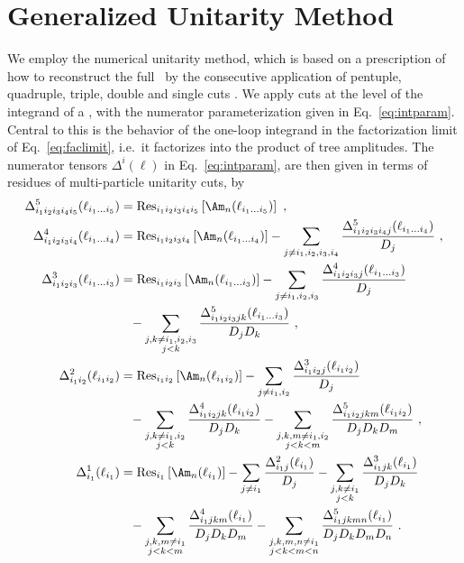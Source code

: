 \section{Generalized Unitarity Method}
We employ the numerical unitarity method, which is based on a prescription of how to reconstruct the full \ola~by the consecutive
application of pentuple, quadruple, triple, double and single cuts
\cite{Bern:1997sc,Britto:2004nc}. We apply cuts at the level of
the integrand of a \ola, with the numerator parameterization given in
Eq.~\eqref{eq:intparam}. Central to this is the behavior of the
one-loop integrand in the factorization limit of
Eq.~\eqref{eq:faclimit}, i.e.\ it factorizes into the product of tree
amplitudes. The numerator tensors $\Delta^i(\ell)$ in
Eq.~\eqref{eq:intparam}, are then given in terms of residues of
multi-particle unitarity cuts, by
\begin{align}\label{eq:unitarityrel}
\begin{split}
  \Delta_{i_1i_2i_3i_4i_5}^5(\ell_{i_1\dots i_5}) &=
  \text{Res}_{i_1i_2i_3i_4i_5}\left[\Am_n(\ell_{i_1\dots i_5})\right]\
  ,\\
  \Delta_{i_1i_2i_3i_4}^4(\ell_{i_1\dots i_4}) &=
  \text{Res}_{i_1i_2i_3i_4}\left[\Am_n(\ell_{i_1\dots i_4})\right]-\sum_{j\neq
      i_1,i_2,i_3,i_4}\frac{\Delta_{i_1i_2i_3i_4j}^5(\ell_{i_1\dots
        i_4})}{D_j}\ ,\\
 \Delta_{i_1i_2i_3}^3(\ell_{i_1\dots i_3}) &=
  \text{Res}_{i_1i_2i_3}\left[\Am_n(\ell_{i_1\dots i_3})\right]-\sum_{j\neq
        i_1,i_2,i_3}\frac{\Delta^4_{i_1i_2i_3j}(\ell_{i_1\dots
          i_3})}{D_j} \\
     &\phantom{=} -\sum_{\substack{j,k\neq
          i_1,i_2,i_3\\j<k}}\frac{\Delta^5_{i_1i_2i_3jk}(\ell_{i_1\dots
          i_3})}{D_jD_k}\ ,\\
 \Delta_{i_1i_2}^2(\ell_{i_1i_2}) &=
  \text{Res}_{i_1i_2}\left[\Am_n(\ell_{i_1i_2})\right]-\sum_{j\neq
        i_1,i_2}\frac{\Delta^3_{i_1i_2j}(\ell_{i_1i_2})}{D_j}\\
&\phantom{=}-\sum_{\substack{j,k\neq
        i_1,i_2\\j< k}}\frac{\Delta^4_{i_1i_2jk}(\ell_{i_1i_2})}{D_jD_k} -
    \sum_{\substack{j,k,m\neq
        i_1,i_2\\j<k<m}}\frac{\Delta^5_{i_1i_2jkm}(\ell_{i_1i_2})}{D_jD_kD_m}\
    ,\\
 \Delta_{i_1}^1(\ell_{i_1})& =
  \text{Res}_{i_1}\left[\Am_n(\ell_{i_1})\right]-\sum_{j\neq
        i_1}\frac{\Delta^2_{i_1j}(\ell_{i_1})}{D_j}-\sum_{\substack{j,k\neq
        i_1\\j<k}}\frac{\Delta^3_{i_1jk}(\ell_{i_1})}{D_jD_k}\\
&\phantom{=}-\sum_{\substack{j,k,m\neq
        i_1\\j< k<m}}\frac{\Delta^4_{i_1jkm}(\ell_{i_1})}{D_jD_kD_m} -
    \sum_{\substack{j,k,m,n\neq
        i_1\\j<k<m<n}}\frac{\Delta^5_{i_1jkmn}(\ell_{i_1})}{D_jD_kD_mD_n}\
    .
\end{split}
\end{align}
